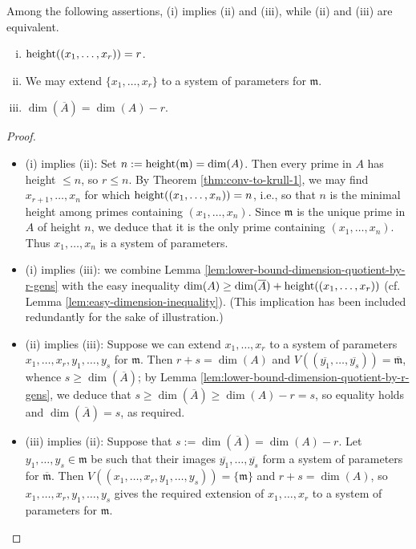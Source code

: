 \documentclass[10pt]{article}
\begin{document}
\begin{theorem}\label{thm:extensions-systems-params}
  Among the following assertions,
  (i) implies (ii) and (iii),
  while (ii) and (iii) are equivalent.
  \begin{enumerate}[(i)]
  \item $\operatorname{height}((x_1,\dotsc,x_r)) = r$.
  \item We may extend $\{x_1,\dotsc,x_r\}$ to a system of
    parameters
    for $\mathfrak{m}$.
  \item $\dim(\overline{A}) = \dim(A) - r$.
  \end{enumerate}
\end{theorem}
\begin{proof}~
  \begin{itemize}
  \item (i) implies (ii): Set
    $n := \operatorname{height}(\mathfrak{m}) = \dim(A)$.  Then every prime in
    $A$ has height $\leq n$, so $r \leq n$.  By Theorem \ref{thm:conv-to-krull-1},
     we may find
    $x_{r+1},\dotsc,x_n$ for which
    $\operatorname{height}((x_1,\dotsc,x_n)) = n$, i.e., so that $n$ is the
    minimal height among primes containing $(x_1,\dotsc,x_n)$.
    Since $\mathfrak{m}$ is the unique prime in $A$ of height
    $n$, we deduce that it is the only prime containing
    $(x_1,\dotsc,x_n)$.
    Thus $x_1,\dotsc,x_n$ is a system of parameters.
  \item
    (i) implies (iii):
    we combine Lemma
    \ref{lem:lower-bound-dimension-quotient-by-r-gens}
    with the easy inequality
    $\dim(A) \geq \dim(\overline{A}) +
    \operatorname{height}((x_1,\dotsc,x_r))$ (cf. Lemma \ref{lem:easy-dimension-inequality}).
    (This implication has been included redundantly for the sake of illustration.)
  \item (ii) implies (iii):
    Suppose we can extend $x_1,\dotsc,x_r$
    to a system of parameters $x_1,\dotsc,x_r,y_1,\dotsc,y_s$
    for $\mathfrak{m}$.
    Then $r + s = \dim(A)$
    and $V((\overline{y_1},\dotsc,\overline{y_s})) =
    \overline{\mathfrak{m}}$,
    whence $s \geq \dim(\overline{A})$;
    by Lemma \ref{lem:lower-bound-dimension-quotient-by-r-gens},
    we deduce that
    $s \geq \dim(\overline{A}) \geq \dim(A) - r = s$,
    so equality holds and $\dim(\overline{A}) = s$, as required.
  \item (iii) implies (ii): Suppose that
    $s := \dim(\overline{A}) = \dim(A) - r$.  Let
    $y_1,\dotsc,y_s \in \mathfrak{m}$ be such that their images
    $\overline{y_1},\dotsc,\overline{y_s}$ form a system of
    parameters for $\overline{\mathfrak{m}}$.  Then
    $V((x_1,\dotsc,x_r,y_1,\dotsc,y_s)) = \{\mathfrak{m}\}$ and
    $r + s = \dim(A)$, so $x_1,\dotsc,x_r,y_1,\dotsc,y_s$ gives
    the required extension of $x_1,\dotsc,x_r$ to a system of
    parameters for $\mathfrak{m}$.
\end{itemize}
\end{proof}
\end{document}
